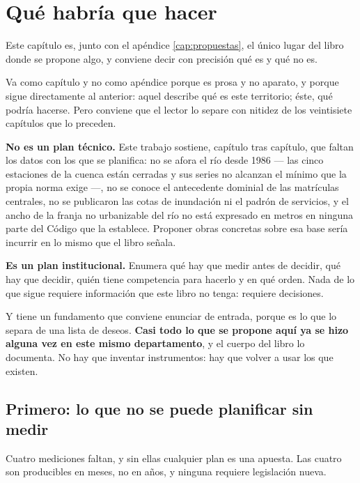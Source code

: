 \chapter{Qué habría que hacer}

\label{cap:plan}
\begin{cautela}
Este capítulo es, junto con el apéndice \ref{cap:propuestas}, el único lugar del libro donde se propone algo, y conviene decir con
precisión qué es y qué no es.

Va como capítulo y no como apéndice porque es prosa y no aparato, y porque sigue
directamente al anterior: aquel describe qué es este territorio; éste, qué podría hacerse.
Pero conviene que el lector lo separe con nitidez de los veintisiete capítulos que lo preceden.

\textbf{No es un plan técnico.} Este trabajo sostiene, capítulo tras capítulo, que faltan los
datos con los que se planifica: no se afora el río desde 1986 --- las cinco estaciones de la cuenca están cerradas y sus series no alcanzan el mínimo que la propia norma exige ---, no se conoce el antecedente dominial de las matrículas centrales, no se publicaron las cotas de inundación ni el padrón de servicios, y el ancho de la franja no urbanizable del río no está expresado en metros en ninguna parte del Código que la establece. Proponer obras concretas sobre esa base sería incurrir en lo mismo que el libro
señala.

\textbf{Es un plan institucional.} Enumera qué hay que medir antes de decidir, qué hay que
decidir, quién tiene competencia para hacerlo y en qué orden. Nada de lo que sigue requiere
información que este libro no tenga: requiere decisiones.

Y tiene un fundamento que conviene enunciar de entrada, porque es lo que lo separa de una
lista de deseos. \textbf{Casi todo lo que se propone aquí ya se hizo alguna vez en este mismo
departamento}, y el cuerpo del libro lo documenta. No hay que inventar instrumentos: hay que
volver a usar los que existen.
\end{cautela}

\section{Primero: lo que no se puede planificar sin medir}

Cuatro mediciones faltan, y sin ellas cualquier plan es una apuesta. Las cuatro son
producibles en meses, no en años, y ninguna requiere legislación nueva.

